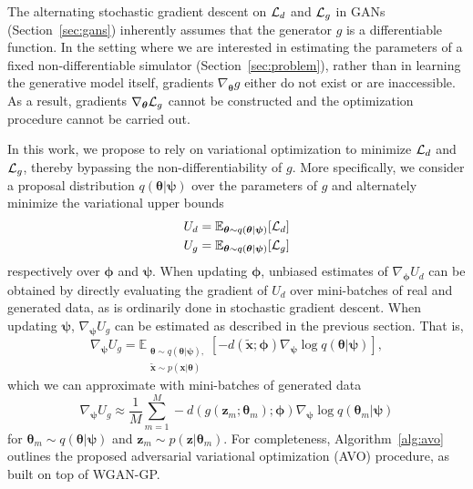 \documentclass[twocolumn,superscriptaddress,aps]{revtex4-1}
\newcommand{\bftheta}{{\bm \theta}}
\newcommand{\bfpsi}{{\bm \psi}}
\newcommand{\bfphi}{{\bm \phi}}
\newcommand{\bfx}{\mathbf{x}}
\newcommand{\bfz}{\mathbf{z}}
\theoremstyle{plain}
\begin{document}
The alternating stochastic gradient descent on ${\cal L}_d$ and ${\cal L}_g$ in
GANs (Section~\ref{sec:gans}) inherently assumes that the generator $g$ is a differentiable function. In
the setting where we are interested in estimating the parameters of a
fixed non-differentiable simulator (Section~\ref{sec:problem}),
rather than in learning the generative model itself,
gradients $\nabla_\bftheta g$ either do not exist or are inaccessible. As a
result, gradients $\nabla_\bftheta {\cal L}_g$ cannot be constructed and the
optimization procedure cannot be carried out.

In this work, we propose to rely on variational optimization to minimize ${\cal
L}_d$ and ${\cal L}_g$, thereby bypassing the non-differentiability of $g$. More
specifically, we consider a proposal distribution $q(\bftheta|\bfpsi)$ over the
parameters of $g$ and alternately minimize the variational upper bounds
\begin{align}
    U_d &= \mathbb{E}_{\bftheta \sim q(\bftheta|\bfpsi)} [ {\cal L}_d ] \label{eqn:vo-ud} \\
    U_g &= \mathbb{E}_{\bftheta \sim q(\bftheta|\bfpsi)} [ {\cal L}_g ] \label{eqn:vo-ug}
\end{align} respectively over $\bfphi$ and $\bfpsi$.
When updating
$\bfphi$, unbiased estimates of $\nabla_\bfphi U_d$ can be obtained by
directly evaluating the gradient of $U_d$ over mini-batches of real and
generated data, as is ordinarily done in stochastic gradient descent. When updating
$\bfpsi$, $\nabla_\bfpsi U_g$ can be estimated as described in the previous section.
That is,
\begin{equation}\label{eqn:grad-ug-approx}
   \nabla_\bfpsi U_g = \mathbb{E}_{\substack{\bftheta \sim q(\bftheta|\bfpsi), \\ \tilde{\bfx} \sim p(\bfx | \bftheta)}}  [-d( \tilde{\bfx} ;\bfphi) \nabla_\bfpsi \log q(\bftheta|\bfpsi)],
\end{equation}
which we can approximate with mini-batches of
generated data
\begin{equation}
    \nabla_\bfpsi U_g \approx \frac{1}{M} \sum_{m=1}^M -d(g(\bfz_m; \bftheta_m); \bfphi) \nabla_\bfpsi \log q(\bftheta_m|\bfpsi)
\end{equation}
for $\bftheta_m \sim q(\bftheta|\bfpsi)$ and $\bfz_m \sim p(\bfz|\bftheta_m)$.
For completeness, Algorithm~\ref{alg:avo} outlines the proposed adversarial variational
optimization (AVO) procedure, as built on top of WGAN-GP.
%
\end{document}
